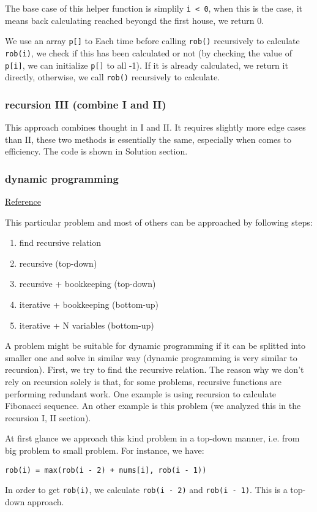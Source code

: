 \documentclass[11pt]{article}
\begin{document}
The base case of this helper function is simplily \texttt{i < 0}, when this is the case, it means back calculating reached beyongd the first house, we return 0.

We use an array \texttt{p[]} to Each time before calling \texttt{rob()} recursively to calculate \texttt{rob(i)}, we check if this has been calculated or not (by checking the value of \texttt{p[i]}, we can initialize \texttt{p[]} to all -1). If it is already calculated, we return it directly, otherwise, we call \texttt{rob()} recursively to calculate.
\subsubsection{recursion III (combine I and II)}
\label{sec:org316ba86}
This approach combines thought in I and II. It requires slightly more edge cases than II, these two methods is essentially the same, especially when comes to efficiency. The code is shown in Solution section.
\subsubsection{dynamic programming}
\label{sec:org878b3f3}
\href{https://leetcode.com/problems/house-robber/discuss/156523/From-good-to-great.-How-to-approach-most-of-DP-problems.}{Reference}

This particular problem and most of others can be approached by following steps:
\begin{enumerate}
\item find recursive relation
\item recursive (top-down)
\item recursive + bookkeeping (top-down)
\item iterative + bookkeeping (bottom-up)
\item iterative + N variables (bottom-up)
\end{enumerate}

A problem might be suitable for dynamic programming if it can be splitted into smaller one and solve in similar way (dynamic programming is very similar to recursion). First, we try to find the recursive relation. The reason why we don't rely on recursion solely is that, for some problems, recursive functions are performing redundant work. One example is using recursion to calculate Fibonacci sequence. An other example is this problem (we analyzed this in the recursion I, II section).

At first glance we approach this kind problem in a top-down manner, i.e. from big problem to small problem. For instance, we have:
\begin{verbatim}
rob(i) = max(rob(i - 2) + nums[i], rob(i - 1))
\end{verbatim}
In order to get \texttt{rob(i)}, we calculate \texttt{rob(i - 2)} and \texttt{rob(i - 1)}. This is a top-down approach.
\end{document}
